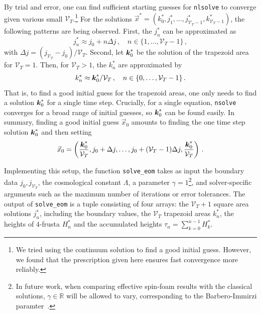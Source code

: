 \documentclass[amsmath,amssymb,aps,twocolumn,superscriptaddress,nofootinbib]{revtex4-1}
\newcommand{\R}{\mathbb{R}}
\begin{document}
By trial and error, one can find sufficient starting guesses for \texttt{nlsolve} to converge given various small $\mathcal{V}_T$.\footnote{We tried using the continuum solution to find a good initial guess. However, we found that the prescription given here ensures fast convergence more reliably.} 
For the solutions $\vec{x}^* = (k_0^*,j_1^*,\dots,j_{\mathcal{V}_T-1}^*,k_{\mathcal{V}_T-1}^*)$, the following patterns are being observed.
First, the $j^*_n$ can be approximated as
%
\begin{equation}\label{eq:j_guess}
j^*_n \approx j_0 + n\Delta j\,,\quad n\in\{1,\dots,\mathcal{V}_T-1\}\,,
\end{equation}
%
with $\Delta j = (j_{\mathcal{V}_T} - j_0)/\mathcal{V}_T$.
Second, let $\vb*{k}_0^*$ be the solution of the trapezoid area for $\mathcal{V}_T = 1$.
Then, for $\mathcal{V}_T > 1$, the $k^*_n$ are approximated by 
%
\begin{equation}\label{eq:k guess}
k^*_n \approx \vb*{k}^*_0/\mathcal{V}_T\,, \quad n\in\{0,\dots,\mathcal{V}_T-1\}\,.
\end{equation}
%
That is, to find a good initial guess for the trapezoid areas, one only needs to find a solution $\vb*{k}_0^*$ for a single time step. 
Crucially, for a single equation, \texttt{nsolve} converges for a broad range of initial guesses, so $\vb*{k}_0^*$ can be found easily.
In summary, finding a good initial guess $\vec{x}_0$ amounts to finding the one time step solution $\vb*{k}_0^*$ and then setting
%
\begin{equation}\label{eq:init guess}
\vec{x}_0 = \left(\frac{\vb*{k}_0^*}{\mathcal{V}_T},j_0+\Delta j,\dots, j_0+(\mathcal{V}_T-1)\Delta j, \frac{\vb*{k}_0^*}{\mathcal{V}_T}\right)\,.
\end{equation}

Implementing this setup, the function \texttt{solve\_eom} takes as input the boundary data $j_0,j_{\mathcal{V}_T}$, the cosmological constant $\Lambda$, a parameter $\gamma = 1$\footnote{In future work, when comparing effective spin-foam results with the classical solutions, $\gamma\in\R$ will be allowed to vary, corresponding to the Barbero-Immirzi paramter~\cite{}.}, and solver-specific arguments such as the maximum number of iterations or  error tolerances.
The output of \texttt{solve\_eom} is a tuple consisting of four arrays: the $\mathcal{V}_T+1$ square area solutions $j^*_n$, including the boundary values, the $\mathcal{V}_T$ trapezoid areas $k^*_n$, the heights of $4$-frusta $H^*_n$ and the accumulated heights $\tau_n = \sum_{k=0}^{n-1}H^*_k$.
\end{document}
